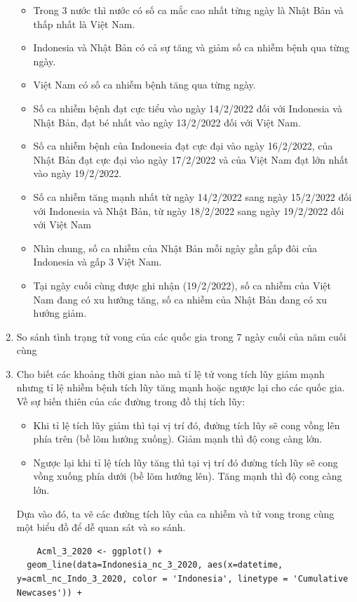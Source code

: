 \documentclass[a4paper]{article}
\theoremstyle{definition}
\begin{document}
\begin{enumerate}[1)]
	\begin{itemize}
		\item Trong 3 nước thì nước có số ca mắc cao nhất từng ngày là Nhật Bản và thấp nhất là Việt Nam.
		\item Indonesia và Nhật Bản có cả sự tăng và giảm số ca nhiễm bệnh qua từng ngày.
		\item Việt Nam có số ca nhiễm bệnh tăng qua từng ngày.
		\item Số ca nhiễm bệnh đạt cực tiểu vào ngày 14/2/2022 đối với Indonesia và Nhật Bản, đạt bé nhất vào ngày 13/2/2022 đối với Việt Nam.
		\item Số ca nhiễm bệnh của Indonesia đạt cực đại vào ngày 16/2/2022, của Nhật Bản đạt cực đại vào ngày 17/2/2022 và của Việt Nam đạt lớn nhất vào ngày 19/2/2022.
		\item Số ca nhiễm tăng mạnh nhất từ ngày 14/2/2022 sang ngày 15/2/2022 đối với Indonesia và Nhật Bản, từ ngày 18/2/2022 sang ngày 19/2/2022 đối với Việt Nam
		\item Nhìn chung, số ca nhiễm của Nhật Bản mỗi ngày gần gấp đôi của Indonesia và gấp 3 Việt Nam.
		\item Tại ngày cuối cùng được ghi nhận (19/2/2022), số ca nhiễm của Việt Nam đang có xu hướng tăng, số ca nhiễm của Nhật Bản đang có xu hướng giảm.
	\end{itemize}
        \item So sánh tình trạng tử vong của các quốc gia trong 7 ngày cuối của năm cuối cùng
        \item Cho biết các khoảng thời gian nào mà tỉ lệ tử vong tích lũy giảm mạnh nhưng tỉ lệ nhiễm bệnh tích lũy tăng mạnh hoặc ngược lại cho các quốc gia.
    Về sự biến thiên của các đường trong đồ thị tích lũy:
    \begin{itemize}
        \item Khi tỉ lệ tích lũy giảm thì tại vị trí đó,  đường tích lũy sẽ cong vồng lên phía trên (bề lõm hướng xuống). Giảm mạnh thì độ cong càng lớn.
        \item Ngược lại khi tỉ lệ tích lũy tăng thì tại vị trí đó đường tích lũy sẽ cong vồng xuống phía dưới (bề lõm hướng lên). Tăng mạnh thì độ cong càng lớn.
    \end{itemize}
    Dựa vào đó, ta vẽ các đường tích lũy của ca nhiễm và tử vong trong cùng một biểu đồ để dễ quan sát và so sánh.
    \begin{lstlisting}
    Acml_3_2020 <- ggplot() +
  geom_line(data=Indonesia_nc_3_2020, aes(x=datetime, y=acml_nc_Indo_3_2020, color = 'Indonesia', linetype = 'Cumulative Newcases')) +

\end{lstlisting}
\end{enumerate}
\end{document}
